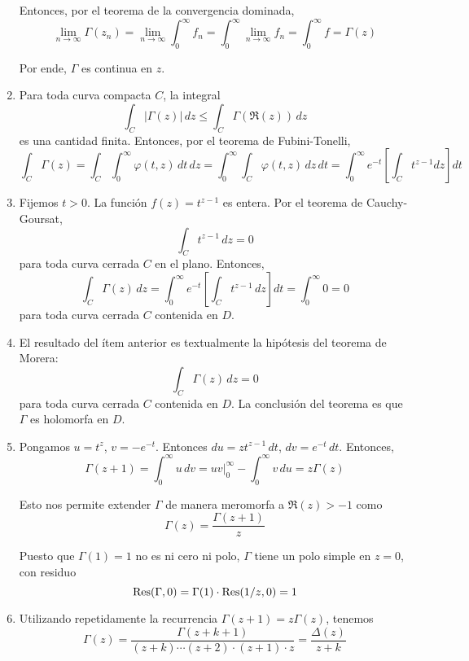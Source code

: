 \begin{solution}
\begin{enumerate}[label=\alph*)]
    Entonces, por el teorema de la convergencia dominada,
    $$
    \lim_{n \to \infty} \Gamma(z_n)
        = \lim_{n \to \infty} \int_0^\infty f_n
        = \int_0^\infty \lim_{n \to \infty} f_n
        = \int_0^\infty f
        = \Gamma(z)
    $$
    
    Por ende, $\Gamma$ es continua en $z$.
    
    \item Para toda curva compacta $C$, la integral
    $$\int_C |\Gamma(z)| \, dz \le \int_C \Gamma(\Re(z)) \, dz$$
    es una cantidad finita. Entonces, por el teorema de Fubini-Tonelli,
    $$
    \int_C \Gamma(z)
        = \int_C \int_0^\infty \varphi(t, z) \, dt \, dz
        = \int_0^\infty \int_C \varphi(t, z) \, dz \, dt
        = \int_0^\infty e^{-t} \left[ \int_C t^{z-1} dz \right] dt
    $$
    
    \item Fijemos $t > 0$. La función $f(z) = t^{z-1}$ es entera. Por el teorema de Cauchy-Goursat,
    $$\int_C t^{z-1} \, dz = 0$$
    para toda curva cerrada $C$ en el plano. Entonces,
    $$
    \int_C \Gamma(z) \, dz
        = \int_0^\infty e^{-t} \left[ \int_C t^{z-1} \, dz \right] dt
        = \int_0^\infty 0
        = 0
    $$
    para toda curva cerrada $C$ contenida en $D$.
    
    \item El resultado del ítem anterior es textualmente la hipótesis del teorema de Morera:
    $$\int_C \Gamma(z) \, dz = 0$$
    para toda curva cerrada $C$ contenida en $D$. La conclusión del teorema es que $\Gamma$ es holomorfa en $D$.
    
    \item Pongamos $u = t^z$, $v = -e^{-t}$. Entonces $du = zt^{z-1} \, dt$, $dv = e^{-t} \, dt$. Entonces,
    $$\Gamma(z+1) = \int_0^\infty u \, dv = uv \Big \vert_0^\infty - \int_0^\infty v \, du = z \Gamma(z)$$
    
    Esto nos permite extender $\Gamma$ de manera meromorfa a $\Re(z) > -1$ como
    $$\Gamma(z) = \frac {\Gamma(z+1)} z$$
    
    Puesto que $\Gamma(1) = 1$ no es ni cero ni polo, $\Gamma$ tiene un polo simple en $z = 0$, con residuo
    $$\operatorname{Res}(\Gamma, 0) = \Gamma(1) \cdot \operatorname{Res}(1/z, 0) = 1$$
    
    \item Utilizando repetidamente la recurrencia $\Gamma(z+1) = z \Gamma(z)$, tenemos
    $$\Gamma(z) = \frac {\Gamma(z+k+1)} {(z+k) \cdots (z+2) \cdot (z+1) \cdot z} = \frac {\Delta(z)} {z+k}$$
    

\end{enumerate}
\end{solution}

